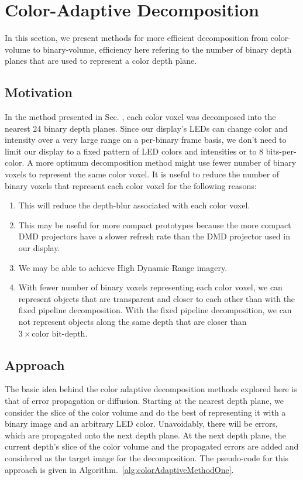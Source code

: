 \section{Color-Adaptive Decomposition}
\label{sec:volumetric:acd}

In this section, we present methods for more efficient decomposition from color-volume to binary-volume, efficiency here refering to the number of binary depth planes that are used to represent a color depth plane. 

\subsection{Motivation}
In the method presented in Sec. , each color voxel was decomposed into the nearest 24 binary depth planes. Since our display's LEDs can change color and intensity over a very large range on a per-binary frame basis, we don't need to limit our display to a fixed pattern of LED colors and intensities or to 8 bits-per-color. A more optimum decomposition method might use fewer number of binary voxels to represent the same color voxel. It is useful to reduce the number of binary voxels that represent each color voxel for the following reasons:

\begin{enumerate}
    \item This will reduce the depth-blur associated with each color voxel.
    \item This may be useful for more compact prototypes because the more compact DMD projectors have a slower refresh rate than the DMD projector used in our display.
    \item We may be able to achieve High Dynamic Range imagery.
    \item With fewer number of binary voxels representing each color voxel, we can represent objects that are transparent and closer to each other than with the fixed pipeline decomposition. With the fixed pipeline decomposition, we can not represent objects along the same depth that are closer than $3 \times \text{color bit-depth}$.
\end{enumerate}

\subsection{Approach}
The basic idea behind the color adaptive decomposition methods explored here is that of error propagation or diffusion. 
Starting at the nearest depth plane, we consider the slice of the color volume and do the best of representing it with a binary image and an arbitrary LED color. 
Unavoidably, there will be errors, which are propagated onto the next depth plane. 
At the next depth plane, the current depth's slice of the color volume and the propagated errors are added and considered as the target image for the decomposition.
The pseudo-code for this approach is given in Algorithm.~\ref{alg:colorAdaptiveMethodOne}.


